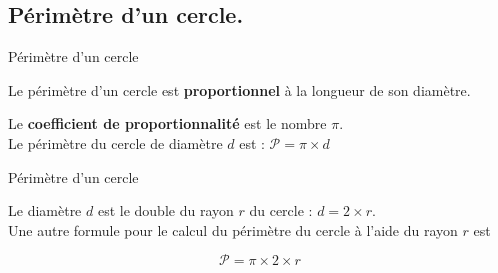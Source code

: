 \begin{pageCours} 
\section{Périmètre d'un cercle.}

\begin{DefT}{Périmètre d'un cercle}

Le périmètre d'un cercle est \textbf{proportionnel} à la longueur de son diamètre.


\begin{minipage}{0.7\linewidth}

Le \textbf{coefficient de proportionnalité} est le nombre $\pi$.\\

Le périmètre du cercle de diamètre $d$ est : $\mathcal{P}=\pi \times d$ \\

\end{minipage}
\begin{minipage}{0.28\linewidth}

 

 
\end{minipage}

\end{DefT}

\begin{Pp}{Périmètre d'un cercle}

\begin{minipage}{0.7\linewidth}

Le diamètre $d$ est le double du rayon $r$ du cercle : $d= 2\times r $. \\

Une autre formule pour le calcul du périmètre du cercle à l'aide du rayon $r$ est 

$$\mathcal{P}=\pi\times 2\times r $$


\end{minipage}
\end{Pp}
\end{pageCours}
